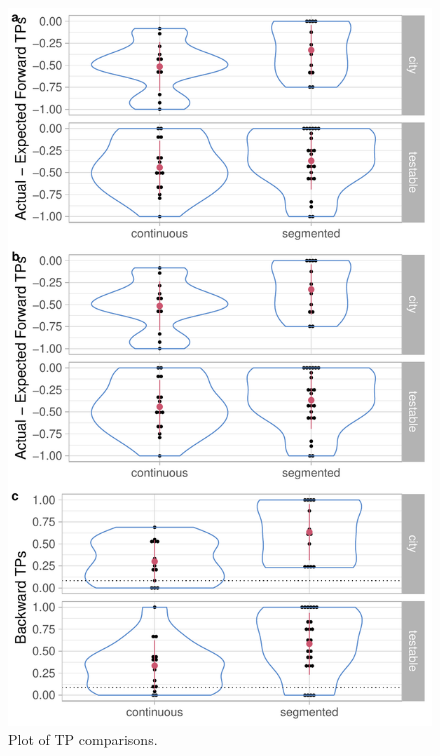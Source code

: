 \documentclass[]{article}
\begin{document}
\begin{figure}

{\centering \includegraphics[width=0.8\linewidth]{segmentation_recall_combined_files/figure-latex/recall-tps-plot-1} 

}

\caption{Plot of TP comparisons.}\label{fig:recall-tps-plot}
\end{figure}
\end{document}
